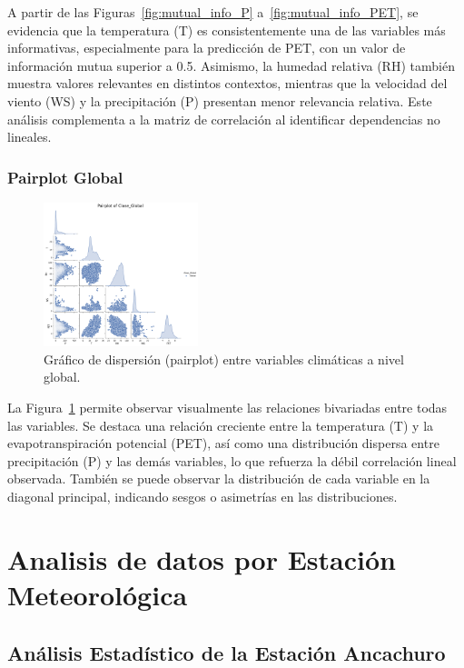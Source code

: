 A partir de las Figuras~\ref{fig:mutual_info_P} a~\ref{fig:mutual_info_PET}, se evidencia que la temperatura (T) es consistentemente una de las variables más informativas, especialmente para la predicción de PET, con un valor de información mutua superior a 0.5. Asimismo, la humedad relativa (RH) también muestra valores relevantes en distintos contextos, mientras que la velocidad del viento (WS) y la precipitación (P) presentan menor relevancia relativa. Este análisis complementa a la matriz de correlación al identificar dependencias no lineales.

\subsection{Pairplot Global}

\begin{figure}[H]
    \centering
    \includegraphics[width=0.4\textwidth]{resultados/global/bivariado/pairplot_global.png}
    \caption{Gráfico de dispersión (pairplot) entre variables climáticas a nivel global.}
    \label{fig:pairplot_global}
\end{figure}

La Figura~\ref{fig:pairplot_global} permite observar visualmente las relaciones bivariadas entre todas las variables. Se destaca una relación creciente entre la temperatura (T) y la evapotranspiración potencial (PET), así como una distribución dispersa entre precipitación (P) y las demás variables, lo que refuerza la débil correlación lineal observada. También se puede observar la distribución de cada variable en la diagonal principal, indicando sesgos o asimetrías en las distribuciones.



\chapter{Analisis de datos por Estación Meteorológica}

\section{Análisis Estadístico de la Estación Ancachuro}

